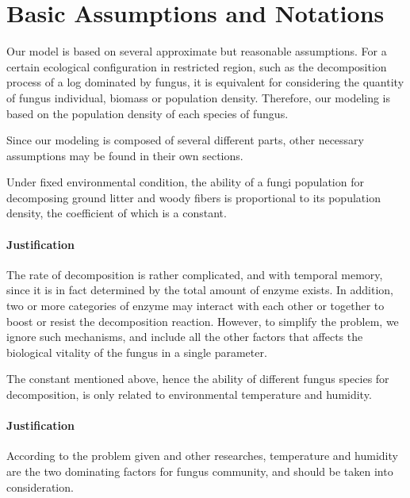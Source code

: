 \section{Basic Assumptions and Notations}\label{sec:assump}

Our model is based on several approximate but reasonable assumptions. For a certain ecological configuration in restricted region, such as the decomposition process of a log dominated by fungus, it is equivalent for considering the quantity of fungus individual, biomass or population density. Therefore, our modeling is based on the population density of each species of fungus.

Since our modeling is composed of several different parts, other necessary assumptions may be found in their own sections. 


\begin{definition}
    Under fixed environmental condition, the ability of a fungi population for decomposing ground litter and woody fibers is proportional to its population density, the coefficient of which is a constant.
\end{definition}

\paragraph*{Justification} The rate of decomposition is rather complicated, and with temporal memory, since it is in fact determined by the total amount of enzyme exists. In addition, two or more categories of enzyme may interact with each other or together to boost or resist the decomposition reaction. However, to simplify the problem, we ignore such mechanisms, and include all the other factors that affects the biological vitality of the fungus in a single parameter.


\begin{definition}
    The constant mentioned above, hence the ability of different fungus species for decomposition, is only related to environmental temperature and humidity.
\end{definition}

\paragraph*{Justification} According to the problem given and other researches, temperature and humidity are the two dominating factors for fungus community, and should be taken into consideration.


